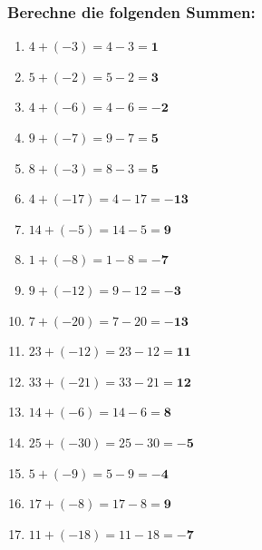 \documentclass[a4paper,10pt]{article} %
\begin{document}
\subsubsection{Berechne die folgenden Summen:} %

\begin{enumerate}

  \item \(4 + (-3) =
    4 - 3 =
    \mathbf{1}\) %

  \item \(5 + (-2) =
    5 - 2 =
    \mathbf{3}\) %

  \item \(4 + (-6) =
    4 - 6 =
    \mathbf{-2}\) %

  \item \(9 + (-7) =
    9 - 7 =
    \mathbf{5}\) %

  \item \(8 + (-3) =
    8 - 3 =
    \mathbf{5}\) %

  \item \(4 + (-17) =
    4 - 17 =
    \mathbf{-13}\) %

  \item \(14 + (-5) =
    14 - 5 =
    \mathbf{9}\) %

  \item \(1 + (-8) =
    1 - 8 =
    \mathbf{-7}\) %

  \item \(9 + (-12) =
    9 - 12 =
    \mathbf{-3}\) %

  \item \(7 + (-20) =
    7 - 20 =
    \mathbf{-13}\) %

  \item \(23 + (-12) =
    23 - 12 =
    \mathbf{11}\) %

  \item \(33 + (-21) =
    33 - 21 =
    \mathbf{12}\) %

  \item \(14 + (-6) =
    14 - 6 =
    \mathbf{8}\) %

  \item \(25 + (-30) =
    25 - 30 =
    \mathbf{-5}\) %

  \item \(5 + (-9) =
    5 - 9 =
    \mathbf{-4}\) %

  \item \(17 + (-8) =
    17 - 8 =
    \mathbf{9}\) %

  \item \(11 + (-18) =
    11 - 18 =
    \mathbf{-7}\) %


\end{enumerate}
\end{document}
